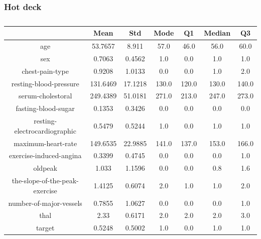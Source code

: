 \documentclass{classrep}
\begin{document}
{{{            }

            \subsubsection{Hot deck}
            \label{results:15-percent:dot-deck} {
                \begin{table}[!htbp]
                    \centering
                    \begin{tabular}{|c|c|c|c|c|c|c|}
                        \hline
                        & Mean & Std & Mode & Q1 & Median & Q3 \\ \hline
                        age & 53.7657 & 8.911 & 57.0 & 46.0 & 56.0 & 60.0 \\ \hline
                        sex & 0.7063 & 0.4562 & 1.0 & 0.0 & 1.0 & 1.0 \\ \hline
                        chest-pain-type & 0.9208 & 1.0133 & 0.0 & 0.0 & 1.0 & 2.0 \\ \hline
                        resting-blood-pressure & 131.6469 & 17.1218 & 130.0 & 120.0 & 130.0 & 140.0 \\ \hline
                        serum-cholestoral & 249.4389 & 51.0181 & 271.0 & 213.0 & 247.0 & 273.0 \\ \hline
                        fasting-blood-sugar & 0.1353 & 0.3426 & 0.0 & 0.0 & 0.0 & 0.0 \\ \hline
                        resting-electrocardiographic & 0.5479 & 0.5244 & 1.0 & 0.0 & 1.0 & 1.0 \\ \hline
                        maximum-heart-rate & 149.6535 & 22.9885 & 141.0 & 137.0 & 153.0 & 166.0 \\ \hline
                        exercise-induced-angina & 0.3399 & 0.4745 & 0.0 & 0.0 & 0.0 & 1.0 \\ \hline
                        oldpeak & 1.033 & 1.1596 & 0.0 & 0.0 & 0.8 & 1.6 \\ \hline
                        the-slope-of-the-peak-exercise & 1.4125 & 0.6074 & 2.0 & 1.0 & 1.0 & 2.0 \\ \hline
                        number-of-major-vessels & 0.7855 & 1.0627 & 0.0 & 0.0 & 0.0 & 1.0 \\ \hline
                        thal & 2.33 & 0.6171 & 2.0 & 2.0 & 2.0 & 3.0 \\ \hline
                        target & 0.5248 & 0.5002 & 1.0 & 0.0 & 1.0 & 1.0 \\ \hline
                    \end{tabular}
                    \caption{}
                    \label{result_15_Hot-deck}
                \end{table}
                \FloatBarrier

}}}
\end{document}
